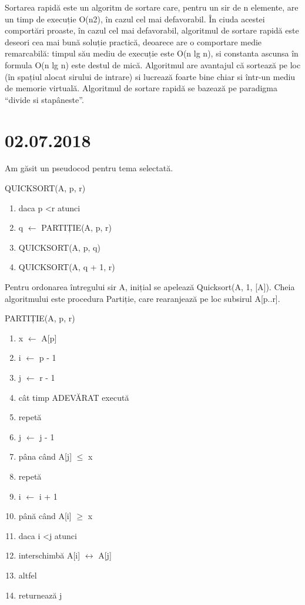 \documentclass{report}
\begin{document}
Sortarea rapidă este un algoritm de sortare care, pentru un sir de n elemente, are un timp de execuție O(n2), în cazul cel mai defavorabil. În ciuda acestei comportări proaste, în cazul cel mai defavorabil, algoritmul de sortare rapidă este deseori cea mai bună soluție practică, deoarece are o comportare medie remarcabilă: timpul său mediu de execuție este O(n lg n), si constanta ascunsa în formula O(n lg n) este destul de mică. Algoritmul are avantajul că sortează pe loc (în spațiul alocat sirului de intrare) si lucrează foarte bine chiar si într-un mediu de memorie virtuală. Algoritmul de sortare rapidă se bazează pe paradigma “divide si stapâneste”.

\chapter{02.07.2018}
Am găsit un pseudocod pentru tema selectată.\newline

QUICKSORT(A, p, r)
\begin{enumerate}
\item daca p \textless r atunci
\item q $\leftarrow$ PARTIȚIE(A, p, r)
\item QUICKSORT(A, p, q)
\item QUICKSORT(A, q + 1, r)
\end{enumerate}

Pentru ordonarea întregului sir A, inițial se apelează Quicksort(A, 1, [A]). Cheia algoritmului este procedura Partiție, care rearanjează pe loc subsirul A[p..r]. \newline

PARTIȚIE(A, p, r)
\begin{enumerate}
\item x $\leftarrow$ A[p]
\item i $\leftarrow$ p - 1
\item j $\leftarrow$ r - 1
\item cât timp ADEVĂRAT execută
\item repetă
\item j $\leftarrow$ j - 1
\item pâna când A[j] $\leq$ x
\item repetă
\item i $\leftarrow$ i + 1
\item până când A[i] $\geq$ x
\item daca i \textless j atunci
\item interschimbă A[i] $\leftrightarrow$ A[j]
\item altfel
\item returnează j
\end{enumerate}
\end{document}
